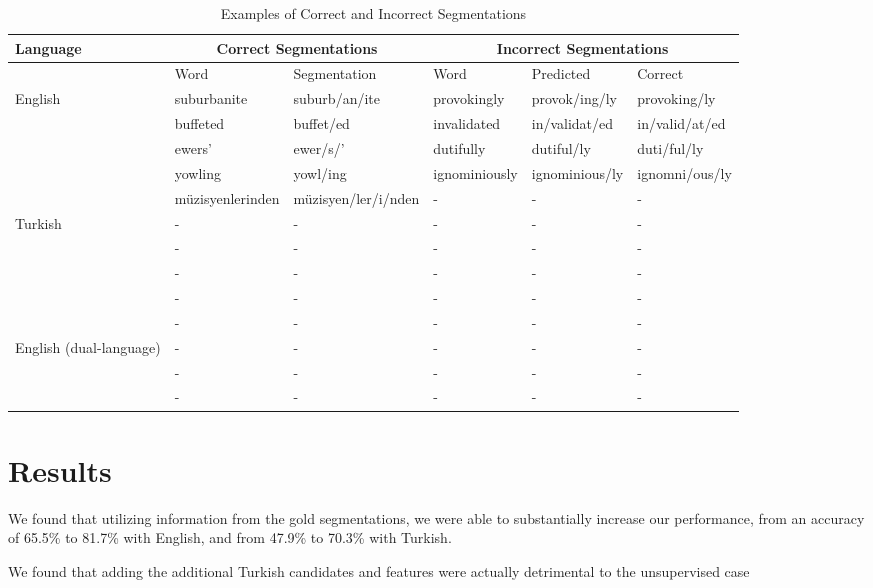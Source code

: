 \documentclass[11pt,twocolumn]{article}
\begin{document}
\begin{table*}
    \begin{center}
        \begin{tabular}{ | l | l | l | l | l | l |}
            \hline
            Language & \multicolumn{2}{|c|}{\textbf{Correct Segmentations}} & \multicolumn{3}{|c|}{\textbf{Incorrect Segmentations}}\\ \hline
                     & Word & Segmentation & Word & Predicted & Correct\\ \hline
            English & suburbanite & suburb/an/ite & provokingly & provok/ing/ly & provoking/ly  \\ 
                    & buffeted & buffet/ed & invalidated  & in/validat/ed & in/valid/at/ed \\ 
                    & ewers' &  ewer/s/' & dutifully & dutiful/ly & duti/ful/ly\\ 
                    & yowling & yowl/ing & ignominiously & ignominious/ly& ignomni/ous/ly \\ 
            \hline
                    & müzisyenlerinden & müzisyen/ler/i/nden & - & - & -\\ 
            Turkish & - & - & - & - & -\\ 
                    & - & - & - & - & -\\ 
                    & - & - & - & - & -\\ \hline
                    & - & - & - & -  & -\\ 
                    & - & - & - & -  & -\\ 
    English (dual-language) & - & - & - & -  & -\\ 
                    & - & - & - & -  & -\\ 
                    & - & - & - & -  & -\\ \hline
                \end{tabular}
        \caption{Examples of Correct and Incorrect Segmentations}
    \end{center}
\end{table*}

\section{Results}
We found that utilizing information from the gold segmentations, we were able to substantially increase our
performance, from an accuracy of 65.5\% to 81.7\% with English, and from 47.9\% to 70.3\% with Turkish.

We found that adding the additional Turkish candidates and features were actually detrimental to the 
unsupervised case 



\end{document}
